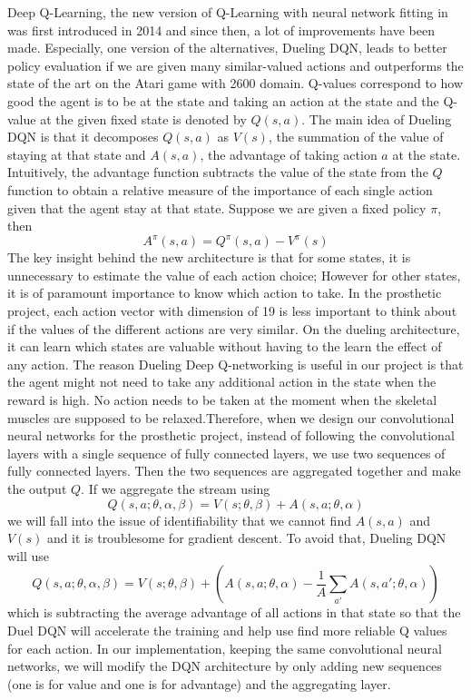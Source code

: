 \documentclass[journal,onecolumn]{IEEEtran}
\begin{document}
Deep Q-Learning, the new version of Q-Learning with neural network fitting in was first introduced in 2014 and since then, a lot of improvements have been made. Especially, one version of the alternatives, Dueling DQN, leads to better policy evaluation if we are given many similar-valued actions and outperforms the state of the art on the Atari game with 2600 domain\cite{WSHHLF}. Q-values correspond to how good the agent is to be at the state and taking an action at the state and the Q-value at the given fixed state is denoted by $Q(s,a)$. The main idea of Dueling DQN is that it decomposes $Q(s,a)$ as $V(s)$, the summation of the value of staying at that state and $A(s,a)$, the advantage of taking action $a$ at the state. Intuitively, the advantage function subtracts the value of the state from the $Q$ function to obtain a relative measure of the importance of each single action given that the agent stay at that state. Suppose we are given a fixed policy $\pi$, then $$A^{\pi}(s,a) = Q^{\pi}(s,a) - V^{\pi}(s)$$ The key insight behind the new architecture is that for some states, it is unnecessary to estimate the value of each action choice; However for other states, it is of paramount importance to know which action to take\cite{WSHHLF}. In the prosthetic project, each action vector with dimension of 19 is less important to think about if the values of the different actions are very similar. On the dueling architecture, it can learn which states are valuable without having to the learn the effect of any action. The reason Dueling Deep Q-networking is useful in our project is that the agent might not need to take any additional action in the state when the reward is high. No action needs to be taken at the moment when the skeletal muscles are supposed to be relaxed.Therefore, when we design our convolutional neural networks for the prosthetic project, instead of following the convolutional layers with a single sequence of fully connected  layers, we use two sequences of fully connected layers. Then the two sequences are aggregated together and make the output $Q$. If we aggregate the stream using $$ Q(s,a;\theta,\alpha,\beta) = V(s;\theta,\beta) + A(s,a;\theta,\alpha) $$ we will fall into the issue of identifiability\cite{WSHHLF} that we cannot find $A(s,a)$ and $V(s)$ and it is troublesome for gradient descent. To avoid that, Dueling DQN will use $$Q(s,a;\theta,\alpha,\beta) = V(s;\theta,\beta) + (A(s,a;\theta,\alpha) - \frac{1}{A}\sum_{a'}{A(s,a';\theta,\alpha)})$$ which is subtracting the average advantage of all actions in that state so that the Duel DQN will accelerate the training and help use find more reliable Q values for each action. In our implementation, keeping the same convolutional neural networks, we will modify the DQN architecture by only adding new sequences (one is for value and one is for advantage) and the aggregating layer.
\end{document}
